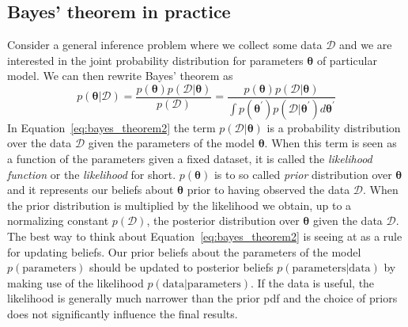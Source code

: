 \documentclass[12pt]{report}
\renewcommand{\vec}[1]{\boldsymbol{\mathbf{#1}}}
\begin{document}
\subsection{Bayes' theorem in practice}
\label{ssec:likelihood_function}
Consider a general inference problem where we collect some data $\mathcal{D}$ and we are interested
in the joint probability distribution for parameters $\boldsymbol\theta$ of particular model.
We can then rewrite Bayes' theorem as
\begin{equation}
    p(\vec{\theta} | \mathcal{D})=\frac{p(\vec{\theta}) p(\mathcal{D} | \vec{\theta})}{p(\mathcal{D})}=\frac{p(\vec{\theta}) p(\mathcal{D} | \vec{\theta})}{\int p\left(\vec{\theta}^{\prime}\right) p\left(\mathcal{D} |\vec{\theta}^{\prime}\right) d \vec{\theta}^{\prime}}
    \label{eq:bayes_theorem2}
\end{equation}
In Equation~\ref{eq:bayes_theorem2} the term $p(\mathcal{D}|\vec{\theta})$  is a probability
distribution over the data $\mathcal{D}$ given the parameters of the model $\vec{\theta}$.
When this term is seen as a function of the parameters given a fixed dataset, it is
called the \emph{likelihood function }  or the \emph{likelihood} for short. $p(\boldsymbol\theta)$
is to so called \emph{prior} distribution over $\vec{\theta}$ and it represents our beliefs
about $\vec{\theta}$ prior to having observed the data $\mathcal{D}$. When the prior distribution is
multiplied by the likelihood we obtain, up to a normalizing constant $p(\mathcal{D})$, the posterior
distribution over $\vec{\theta}$ given the data $\mathcal{D}$.
The best way to think about Equation~\ref{eq:bayes_theorem2} is seeing at as a rule
for updating beliefs. Our prior beliefs about the parameters of the model
$p(\mathrm{parameters})$ should be updated to posterior beliefs $
    p(\mathrm{parameters} | \mathrm{data})$ by making use of the likelihood
$p(\mathrm{data} | \mathrm{parameters})$. If the data is useful, the likelihood is generally
much narrower than the prior pdf and the choice of priors does not significantly
influence the final results.
\end{document}

